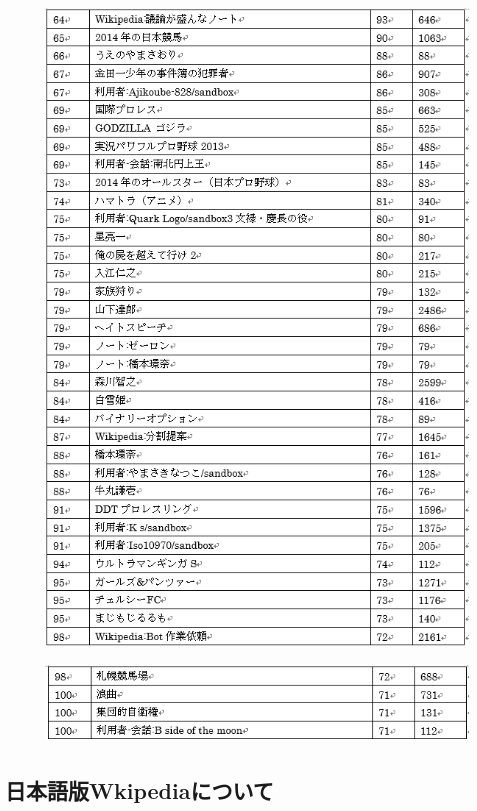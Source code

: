 \begin{figure}[H]
\centering
\includegraphics[width=12cm]{sample8.png}

\end{figure}


\begin{figure}[H]
\centering
\includegraphics[width=12cm]{sample9.png}

\end{figure}


\subsection{日本語版Wkipediaについて}

